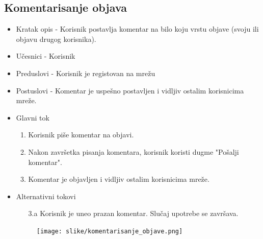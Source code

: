 \subsection{Komentarisanje objava}
\begin{itemize}
	\item Kratak opis - Korisnik postavlja komentar na bilo koju vrstu objave (svoju ili objavu drugog korisnika). 
	\item Učesnici - Korisnik
	\item Preduslovi - Korisnik je registovan na mrežu
	\item Postuslovi - Komentar je uspešno postavljen i vidljiv ostalim korisnicima mreže.
	\item Glavni tok
	\begin{enumerate}
		\item Korisnik piše komentar na objavi.
		\item Nakon završetka pisanja komentara, korisnik koristi dugme "Pošalji komentar". 
		\item Komentar je objavljen i vidljiv ostalim korisnicima mreže.
	\end{enumerate}
	\item Alternativni tokovi
    \begin{itemize}
		\item[3.a] Korisnik je uneo prazan komentar. Slučaj upotrebe se završava.
	\end{itemize}
\begin{figure}[h!]
		\centerline{\texttt{[image: slike/komentarisanje\_objave.png]}}
\end{figure}
\end{itemize}

